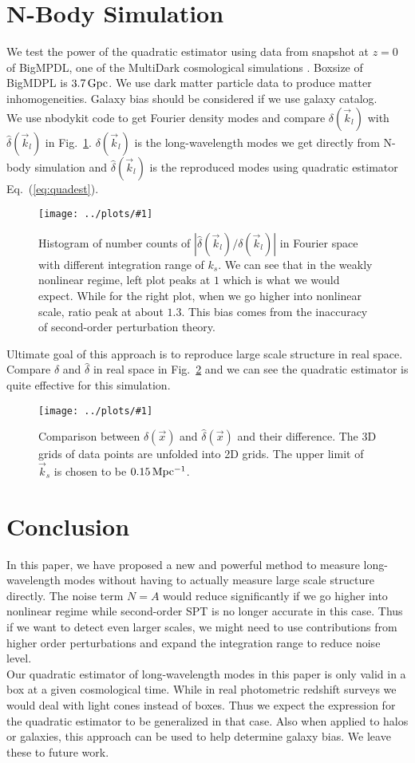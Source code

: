 \documentclass[prd,amsmath,amssymb,floatfix,superscriptaddress,nofootinbib,twocolumn]{revtex4-1}
\newcommand{\vk}{\vec{k}}
\newcommand{\ec}[1]{Eq.~(\ref{eq:#1})}
\newcommand{\rf}[1]{\ref{fig:#1}}
\newcommand{\sfig}[2]{
\texttt{[image: ../plots/\#1]}
        }
\newcommand{\sfigg}[2]{
\texttt{[image: ../plots/\#1]}
        }
\newcommand{\Sfig}[2]{
   \begin{figure}[thbp]
   \begin{center}
    \sfig{../plots/#1.pdf}{\columnwidth}
    \caption{{\small #2}}
    \label{fig:#1}
     \end{center}
   \end{figure}
}
\newcommand{\Sfigg}[2]{
   \begin{figure}[thbp]
    \sfigg{../plots/#1.pdf}{\columnwidth}
    \caption{{\small #2}}
    \label{fig:#1}
   \end{figure}
}
\begin{document}
\section{N-Body Simulation}\label{sec3}
We test the power of the quadratic estimator using data from snapshot at $z=0$ of BigMPDL, one of the MultiDark cosmological simulations \cite{Klypin:2014nov}. Boxsize of BigMDPL is $3.7\,\rm Gpc$. We use dark matter particle data to produce matter inhomogeneities. Galaxy bias should be considered if we use galaxy catalog.\\
We use nbodykit code to get Fourier density modes \cite{Hand:2018nby} and compare $\delta(\vk_l)$ with $\hat{\delta}(\vk_l)$ in Fig.~\rf{hist}. $\delta(\vk_l)$ is the long-wavelength modes we get directly from N-body simulation and $\hat{\delta}(\vk_l)$ is the reproduced modes using quadratic estimator \ec{quadest}.\\
\Sfig{hist}{Histogram of number counts of $|\hat{\delta}(\vk_l)/\delta(\vk_l)|$ in Fourier space with different integration range of $k_s$. We can see that in the weakly nonlinear regime, left plot peaks at $1$ which is what we would expect. While for the right plot, when we go higher into nonlinear scale, ratio peak at about $1.3$. This bias comes from the inaccuracy of second-order perturbation theory.}

Ultimate goal of this approach is to reproduce large scale structure in real space. Compare $\delta$ and $\hat{\delta}$ in real space in Fig.~\rf{real} and we can see the quadratic estimator is quite effective for this simulation.
\Sfigg{real}{Comparison between $\delta(\vec{x})$ and $\hat{\delta}(\vec{x})$ and their difference. The 3D grids of data points are unfolded into 2D grids. The upper limit of $\vk_s$ is chosen to be $0.15 \, \rm Mpc^{-1}$.}

\section{Conclusion}\label{sec4}
In this paper, we have proposed a new and powerful method to measure long-wavelength modes without having to actually measure large scale structure directly. The noise term $N=A$ would reduce significantly if we go higher into nonlinear regime while second-order SPT is no longer accurate in this case. Thus if we want to detect even larger scales, we might need to use contributions from higher order perturbations and expand the integration range to reduce noise level. \\
Our quadratic estimator of long-wavelength modes in this paper is only valid in a box at a given cosmological time. While in real photometric redshift surveys we would deal with light cones instead of boxes. Thus we expect the expression for the quadratic estimator to be generalized in that case. Also when applied to halos or galaxies, this approach can be used to help determine galaxy bias. We leave these to future work.
\end{document}
